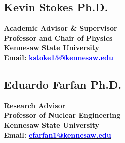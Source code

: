 \documentclass[margin, 10pt]{res} %
\begin{document}
\begin{resume}
\subsection{Kevin Stokes Ph.D.}
\textbf{Academic Advisor \& Supervisor} \\
\textbf{Professor and Chair of Physics} \\
\textbf{Kennesaw State University} \\
\textbf{Email:} \href{mailto:kstoke15@kennesaw.edu}{\textcolor{blue}{\textbf{kstoke15@kennesaw.edu}}}

\subsection{Eduardo Farfan Ph.D.}
\textbf{Research Advisor} \\
\textbf{Professor of Nuclear Engineering} \\
\textbf{Kennesaw State University} \\
\textbf{Email:} \href{mailto:efarfan1@kennesaw.edu}{\textcolor{blue}{\textbf{efarfan1@kennesaw.edu}}}

\end{resume}
\end{document}
